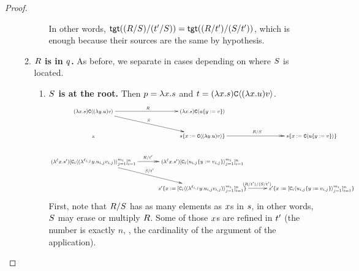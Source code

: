\begin{proof}
\begin{gonzaenv}
\begin{enumerate}
\begin{enumerate}
\begin{enumerate}
            In other words, $\mathsf{tgt}((R / S) / (t' / S)) =
                             \mathsf{tgt}((R / t') / (S / t'))$, which is enough because their sources
                             are the same by hypothesis.
        \end{enumerate}
      \item {\bf $R$ is in $q$.} As before, we separate in cases depending on where $S$ is located.
        \begin{enumerate}
          \item {\bf $S$ is at the root.} Then $p = \lambda x. s$
            and $t = (\lambda x. s) \mathtt{C}\langle(\lambda x. u) v\rangle$.
            \[
            {\footnotesize
            \xymatrix@C=1cm{
              (\lam{\var}{\tmtwo}) \conof{(\lam{\vartwo}{\tmthree}) \tmthreevariant}
                \ar@{->}[r]^{\redex} \ar@{->}[rd]^{\redextwo} \ar@{}[dd]|*=0[@]{\rtimes}
                  & (\lam{\var}{\tmtwo}) \conof{\subs{\tmthree}{\vartwo}{\tmthreevariant}} & \\
                & \subs{\tmtwo}{\var}{\conof{(\lam{\vartwo}{\tmthree}) \tmthreevariant}}
                  \ar@{->>}[r]^{\redex / \redextwo}
                    & \subs{\tmtwo}{\var}{\conof{\subs{\tmthree}{\vartwo}{\tmthreevariant}}} \\
                \ar@{->>}[r]^{\redex / \tm'} \ar@{->}[rd]^{\redextwo / \tm'}
              (\lamp{\lab}{\var}{\tmtwo'}) [\con_i\of{(\lamp{\lab_{i,j}}{\vartwo}{\tmthree_{i,j}} \tmthreevariant_{i,j})}_{j=1}^{m_i}]_{i=1}^n
                  & (\lamp{\lab}{\var}{\tmtwo'}) [\con_i\of{\subs{\tmthree_{i,j}}{\vartwo}{\tmthreevariant_{i,j}}}_{j=1}^{m_i}]_{i=1}^n & \\
                & \subs{\tmtwo'}{\var}{[\con_i\of{(\lamp{\lab_{i,j}}{\vartwo}{\tmthree_{i,j}} \tmthreevariant_{i,j})}_{j=1}^{m_i}]_{i=1}^n} \ar@{->}[r]^{(\redex / \tm') / (\redextwo / \tm')}
                  & \subs{\tmtwo'}{\var}{[\con_i\of{\subs{\tmthree_{i,j}}{\vartwo}{\tmthreevariant_{i,j}}}_{j=1}^{m_i}]_{i=1}^n}
              }
            }
            \]
            First, note that $R / S$ has as many elements as $x$s in $s$, in other words,
            $S$ may erase or multiply $R$.
            Some of those $x$s are refined in $t'$ (the number is exactly $n$,
            \ie, the cardinality of the argument of the application).


\end{enumerate}
\end{enumerate}
\end{enumerate}
\end{gonzaenv}
\end{proof}
